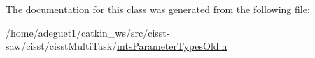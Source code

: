 The documentation for this class was generated from the following file\-:\begin{DoxyCompactItemize}
\item 
/home/adeguet1/catkin\-\_\-ws/src/cisst-\/saw/cisst/cisst\-Multi\-Task/\hyperlink{mts_parameter_types_old_8h}{mts\-Parameter\-Types\-Old.\-h}\end{DoxyCompactItemize}
